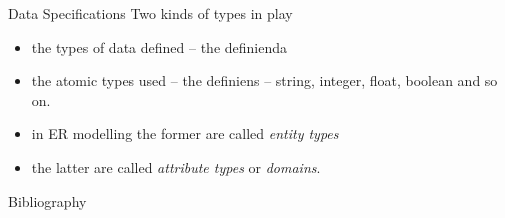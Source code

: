 \documentclass[xcolor=pst,dvips]{beamer}   %
\begin{document}
\begin{frame}{Data Specifications}
Two kinds of types in play
\begin{itemize}
\item the types of data defined -- the definienda
\pause \item the atomic types used -- the definiens  -- string, integer, float, boolean and so on.
\pause \item in ER modelling the former are called \textit{entity types}
\pause \item the latter are called \textit{attribute types} or \textit{domains}.
\end{itemize}
\end{frame}

\begin{frame}{Bibliography}

\end{frame}

\end{document}
